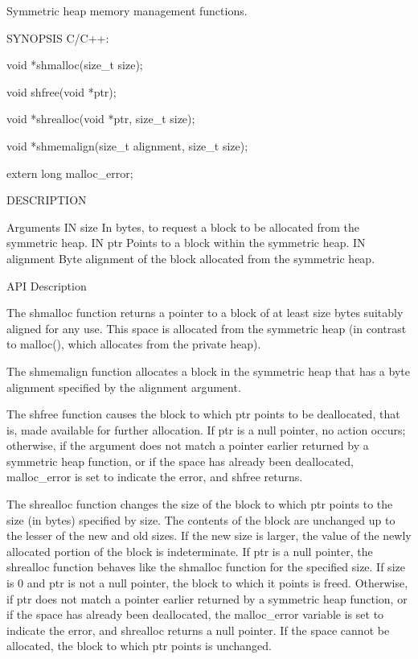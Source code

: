 Symmetric  heap	memory management functions.

SYNOPSIS
       C/C++:

       void *shmalloc(size_t size);

       void shfree(void *ptr);

       void *shrealloc(void *ptr, size_t size);

       void *shmemalign(size_t alignment, size_t size);

       extern long malloc_error;

DESCRIPTION

Arguments
       IN	size		In bytes, to request a block to be allocated from the symmetric heap.
       IN	ptr		Points to a block within the symmetric heap.
       IN	alignment	Byte alignment of the block allocated from the symmetric heap.

API Description

       The shmalloc function returns a pointer to a block  of  at  least  size
       bytes  suitably	aligned for any use.  This space is allocated from the
       symmetric heap (in contrast to malloc(),  which  allocates  from  the
       private heap).

       The  shmemalign	function  allocates a block in the symmetric heap that
       has a byte alignment specified by the alignment argument.

       The shfree function  causes  the	 block	to  which  ptr	points	to  be
       deallocated, that is, made available for further allocation.  If ptr is
       a null pointer, no action occurs; otherwise, if the argument  does  not
       match  a	 pointer  earlier returned by a symmetric heap function, or if
       the space has already been deallocated, malloc_error is set to indicate
       the error, and shfree returns.

       The  shrealloc  function	 changes  the  size  of the block to which ptr
       points to the size (in bytes) specified by size.	 The contents  of  the
       block  are unchanged up to the lesser of the new and old sizes.	If the
       new size is larger, the value of the newly  allocated  portion  of  the
       block  is  indeterminate.   If  ptr  is	a  null pointer, the shrealloc
       function behaves like the shmalloc function for the specified size.  If
       size  is	 0 and ptr is not a null pointer, the block to which it points
       is freed.  Otherwise, if ptr does not match a pointer earlier  returned
       by  a  symmetric	 heap  function,  or  if  the  space  has already been
       deallocated, the malloc_error variable is set to	 indicate  the	error,
       and  shrealloc  returns	a  null	 pointer.   If	the  space  cannot  be
       allocated, the block to which ptr points is unchanged.

